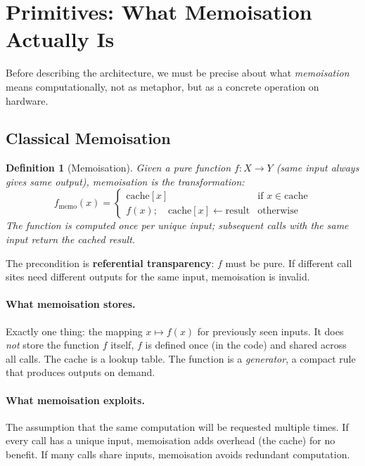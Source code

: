 \documentclass[11pt, a4paper]{article}
\newtheorem{definition}{Definition}
\theoremstyle{remark}
\begin{document}


\section{Primitives: What Memoisation Actually Is}

Before describing the architecture, we must be precise about what \emph{memoisation} means computationally, not as metaphor, but as a concrete operation on hardware.

\subsection{Classical Memoisation}

\begin{definition}[Memoisation]
Given a pure function $f: X \to Y$ (same input always gives same output), memoisation is the transformation:
\[
    f_{\text{memo}}(x) = \begin{cases}
        \text{cache}[x] & \text{if } x \in \text{cache} \\
        f(x); \quad \text{cache}[x] \leftarrow \text{result} & \text{otherwise}
    \end{cases}
\]
The function is computed once per unique input; subsequent calls with the same input return the cached result.
\end{definition}

The precondition is \textbf{referential transparency}: $f$ must be pure.
If different call sites need different outputs for the same input, memoisation is invalid.

\paragraph{What memoisation stores.}
Exactly one thing: the mapping $x \mapsto f(x)$ for previously seen inputs.
It does \emph{not} store the function $f$ itself, $f$ is defined once (in the code) and shared across all calls.
The cache is a lookup table.
The function is a \emph{generator}, a compact rule that produces outputs on demand.

\paragraph{What memoisation exploits.}
The assumption that the same computation will be requested multiple times.
If every call has a unique input, memoisation adds overhead (the cache) for no benefit.
If many calls share inputs, memoisation avoids redundant computation.
\end{document}
